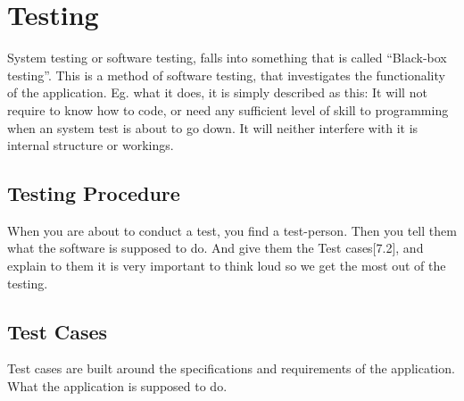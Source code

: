 
\section{Testing}
\thispagestyle{plain}
System testing or software testing, falls into something that is called “Black-box testing”. This is a method of software testing, that investigates the functionality of the application. Eg. what it does, it is simply described as this:
It will not require to know how to code, or need any sufficient level of skill to programming when an system test is about to go down. It will neither interfere with it is internal structure or workings. 

\subsection{Testing Procedure}

When you are about to conduct a test, you find a test-person. Then you tell them what the software is supposed to do. And give them the Test cases[7.2], and explain to them it is very important to think loud so we get the most out of the testing. 

\subsection{Test Cases}

Test cases are built around the specifications and requirements of the application. What the application is supposed to do.  

